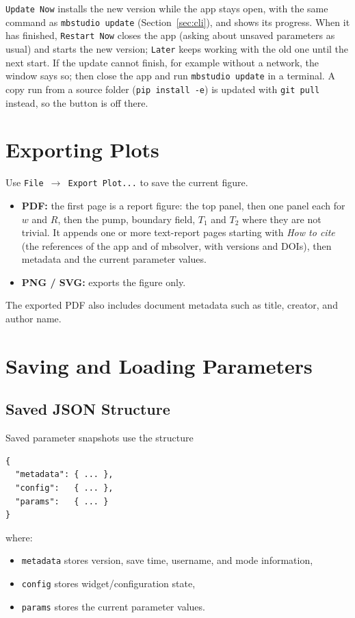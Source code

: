 \documentclass[12pt,a4paper]{article}
\newcommand{\menu}[1]{\texttt{#1}}
\begin{document}
\menu{Update Now} installs the new version while the app stays open, with the same command as
\texttt{mbstudio update} (Section~\ref{sec:cli}), and shows its progress. When it has finished,
\menu{Restart Now} closes the app (asking about unsaved parameters as usual) and starts the new
version; \menu{Later} keeps working with the old one until the next start. If the update cannot
finish, for example without a network, the window says so; then close the app and run
\texttt{mbstudio update} in a terminal. A copy run from a source folder (\texttt{pip install -e})
is updated with \texttt{git pull} instead, so the button is off there.

\section{Exporting Plots}

Use \menu{File $\to$ Export Plot...} to save the current figure.

\begin{itemize}[noitemsep]
  \item \textbf{PDF:} the first page is a report figure: the top panel, then one panel each for
  $w$ and $R$, then the pump, boundary field, $T_1$ and $T_2$ where they are not trivial. It
  appends one or more text-report pages
  starting with \emph{How to cite} (the references of the app and of mbsolver, with versions and DOIs),
  then metadata and the current parameter values.
  \item \textbf{PNG / SVG:} exports the figure only.
\end{itemize}

The exported PDF also includes document metadata such as title, creator, and author name.

\section{Saving and Loading Parameters}

\subsection{Saved JSON Structure}\label{sec:json}

Saved parameter snapshots use the structure
\begin{verbatim}
{
  "metadata": { ... },
  "config":   { ... },
  "params":   { ... }
}
\end{verbatim}
where:
\begin{itemize}[noitemsep]
  \item \texttt{metadata} stores version, save time, username, and mode information,
  \item \texttt{config} stores widget/configuration state,
  \item \texttt{params} stores the current parameter values.
\end{itemize}
\end{document}
